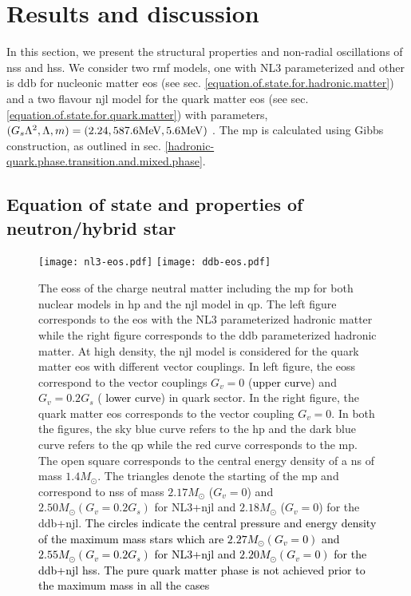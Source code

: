 \documentclass[a4paper, 11pt]{article}
\newcommand{\magenta}[1]{\textcolor{black}{#1}}
\begin{document}
\section{Results and discussion} \label{results.and.discussion}
In this section, we present the structural properties and non-radial oscillations of \ac{ns}s and \ac{hs}s. We consider two \ac{rmf} models, one with NL3 \cite{Tolos:2016} parameterized and other is \ac{ddb} \cite{Malik:2022jqc,Malik:2022aas} for nucleonic matter \ac{eos} (see sec. \ref{equation.of.state.for.hadronic.matter}) and a two flavour \ac{njl} model for the quark matter \ac{eos} (see sec. \ref{equation.of.state.for.quark.matter}) with parameters, $(G_s\Lambda^2, \Lambda, m) = (2.24, 587.6 {\rm  MeV}, 5.6 {\rm  MeV})$ \cite{Buballa:2005}. The \ac{mp} is calculated using Gibbs construction, as outlined in sec. \ref{hadronic-quark.phase.transition.and.mixed.phase}.



\subsection{Equation of state and properties of neutron/hybrid star}

\begin{figure}
\centering
\texttt{[image: nl3-eos.pdf]}
\texttt{[image: ddb-eos.pdf]}
\caption{The \ac{eos}s of the charge neutral matter including the \ac{mp} for both nuclear models in 
\ac{hp} and the \ac{njl} model in \ac{qp}. The left figure corresponds to the \ac{eos} with the NL3 parameterized 
hadronic matter while the right figure corresponds to the \ac{ddb} parameterized hadronic matter. At high density, 
the \ac{njl} model is considered for the quark matter \ac{eos} with different vector couplings. 
In left figure, the \ac{eos}s correspond to the vector couplings $G_v=0$ (\magenta{upper curve}) and $G_v=0.2 G_s$ (\magenta{
lower curve}) in quark sector. In the right figure, the  quark matter \ac{eos} corresponds to the vector coupling $G_v=0$. 
In both the figures, the sky blue curve refers to the \ac{hp} and the dark blue curve refers to the \ac{qp} while the
 red curve corresponds to the \ac{mp}. The open square corresponds to the central energy density of 
a \ac{ns} of mass $1.4 M_{\odot}$. The triangles denote the starting of the \ac{mp} and correspond to \ac{ns}s 
of mass $2.17 M_{\odot}$ ($G_v=0$) and $2.50 M_{\odot} (G_v=0.2 G_s)$ for NL3+\ac{njl} and $2.18 M_{\odot}$ ($G_v=0$) for 
the \ac{ddb}+\ac{njl}. \magenta{The circles indicate the central pressure and energy density of the maximum mass stars
which are  $2.27 M_{\odot} (G_v=0)$ and $2.55 M_{\odot} (G_v=0.2 G_s)$  for NL3+\ac{njl} and
 $2.20 M_{\odot} (G_v=0)$ for the \ac{ddb}+\ac{njl} \ac{hs}s. The pure quark matter phase is not achieved prior to the maximum
mass in all the cases}}
\label{figure:eos}
\end{figure}
\end{document}
